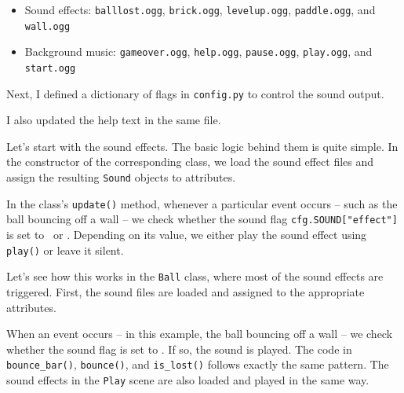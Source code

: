 \begin{itemize}
	\item Sound effects: \texttt{balllost.ogg}, \texttt{brick.ogg}, \texttt{levelup.ogg}, \texttt{paddle.ogg}, and \texttt{wall.ogg}
	\item Background music: \texttt{gameover.ogg}, \texttt{help.ogg}, \texttt{pause.ogg}, \texttt{play.ogg}, and \texttt{start.ogg}
\end{itemize}

Next, I defined a dictionary of flags in \texttt{config.py} to control the sound output.


I also updated the help text in the same file.


Let's start with the sound effects. The basic logic behind them is quite simple. In the constructor of the corresponding class, we load the sound effect files and assign the resulting \texttt{Sound} objects to attributes.

In the class's \texttt{update()} method, whenever a particular event occurs -- such as the ball bouncing off a wall -- we check whether the sound flag \verb=cfg.SOUND["effect"]= is set to \true\ or \false. Depending on its value, we either play the sound effect using \texttt{play()} or leave it silent.

Let's see how this works in the \texttt{Ball} class, where most of the sound effects are triggered. First, the sound files are loaded and assigned to the appropriate attributes.


When an event occurs -- in this example, the ball bouncing off a wall -- we check whether the sound flag is set to \true. If so, the sound is played. The code in \texttt{bounce\_bar()}, \texttt{bounce()}, and \texttt{is\_lost()} follows exactly the same pattern. The sound effects in the \texttt{Play} scene are also loaded and played in the same way.


